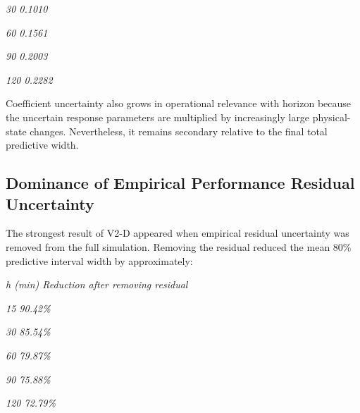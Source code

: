 \begin{center}\textit{30                    0.1010}\end{center}

\begin{center}\textit{60                    0.1561}\end{center}

\begin{center}\textit{90                    0.2003}\end{center}

\begin{center}\textit{120                    0.2282}\end{center}

Coefficient uncertainty also grows in operational relevance with horizon because the uncertain response parameters are multiplied by increasingly large physical-state changes. Nevertheless, it remains secondary relative to the final total predictive width.

\subsection{Dominance of Empirical Performance Residual Uncertainty}
The strongest result of V2-D appeared when empirical residual uncertainty was removed from the full simulation. Removing the residual reduced the mean 80\% predictive interval width by approximately:

\begin{center}\textit{h (min)    Reduction after removing residual}\end{center}

\begin{center}\textit{15                   90.42\%}\end{center}

\begin{center}\textit{30                   85.54\%}\end{center}

\begin{center}\textit{60                   79.87\%}\end{center}

\begin{center}\textit{90                   75.88\%}\end{center}

\begin{center}\textit{120                   72.79\%}\end{center}

